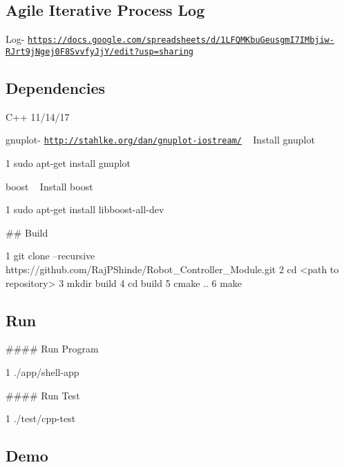 \subsection*{Agile Iterative Process Log}

Log-\/ \href{https://docs.google.com/spreadsheets/d/1LFQMKbuGeusgmI7IMbjiw-RJrt9jNgej0F8SvvfyJjY/edit?usp=sharing}{\tt https\+://docs.\+google.\+com/spreadsheets/d/1\+L\+F\+Q\+M\+Kbu\+Geusgm\+I7\+I\+Mbjiw-\/\+R\+Jrt9j\+Ngej0\+F8\+Svvfy\+Jj\+Y/edit?usp=sharing}

\subsection*{Dependencies}


\begin{DoxyEnumerate}
\item C++ 11/14/17
\item gnuplot-\/ \href{http://stahlke.org/dan/gnuplot-iostream/}{\tt http\+://stahlke.\+org/dan/gnuplot-\/iostream/} ~\newline
Install gnuplot 
\begin{DoxyCode}
1 sudo apt-get install gnuplot
\end{DoxyCode}

\item boost ~\newline
Install boost 
\begin{DoxyCode}
1 sudo apt-get install libboost-all-dev
\end{DoxyCode}

\end{DoxyEnumerate}

\#\# Build 
\begin{DoxyCode}
1 git clone --recursive https://github.com/RajPShinde/Robot\_Controller\_Module.git
2 cd <path to repository>
3 mkdir build
4 cd build
5 cmake ..
6 make
\end{DoxyCode}
 \subsection*{Run}

\#\#\#\# Run Program 
\begin{DoxyCode}
1 ./app/shell-app
\end{DoxyCode}
 \#\#\#\# Run Test 
\begin{DoxyCode}
1 ./test/cpp-test
\end{DoxyCode}
 \subsection*{Demo}

